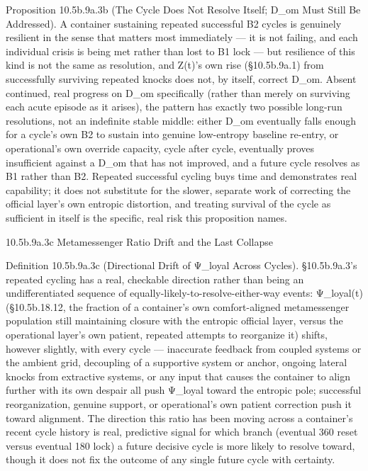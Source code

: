 \documentclass[
]{article}
\begin{document}
Proposition 10.5b.9a.3b (The Cycle Does Not Resolve Itself; D\_om Must
Still Be Addressed). A container sustaining repeated successful B2
cycles is genuinely resilient in the sense that matters most immediately
--- it is not failing, and each individual crisis is being met rather
than lost to B1 lock --- but resilience of this kind is not the same as
resolution, and Z(t)'s own rise (§10.5b.9a.1) from successfully
surviving repeated knocks does not, by itself, correct D\_om. Absent
continued, real progress on D\_om specifically (rather than merely on
surviving each acute episode as it arises), the pattern has exactly two
possible long-run resolutions, not an indefinite stable middle: either
D\_om eventually falls enough for a cycle's own B2 to sustain into
genuine low-entropy baseline re-entry, or operational's own override
capacity, cycle after cycle, eventually proves insufficient against a
D\_om that has not improved, and a future cycle resolves as B1 rather
than B2. Repeated successful cycling buys time and demonstrates real
capability; it does not substitute for the slower, separate work of
correcting the official layer's own entropic distortion, and treating
survival of the cycle as sufficient in itself is the specific, real risk
this proposition names.

10.5b.9a.3c Metamessenger Ratio Drift and the Last Collapse

Definition 10.5b.9a.3c (Directional Drift of Ψ\_loyal Across Cycles).
§10.5b.9a.3's repeated cycling has a real, checkable direction rather
than being an undifferentiated sequence of
equally-likely-to-resolve-either-way events: Ψ\_loyal(t) (§10.5b.18.12,
the fraction of a container's own comfort-aligned metamessenger
population still maintaining closure with the entropic official layer,
versus the operational layer's own patient, repeated attempts to
reorganize it) shifts, however slightly, with every cycle --- inaccurate
feedback from coupled systems or the ambient grid, decoupling of a
supportive system or anchor, ongoing lateral knocks from extractive
systems, or any input that causes the container to align further with
its own despair all push Ψ\_loyal toward the entropic pole; successful
reorganization, genuine support, or operational's own patient correction
push it toward alignment. The direction this ratio has been moving
across a container's recent cycle history is real, predictive signal for
which branch (eventual 360 reset versus eventual 180 lock) a future
decisive cycle is more likely to resolve toward, though it does not fix
the outcome of any single future cycle with certainty.
\end{document}
